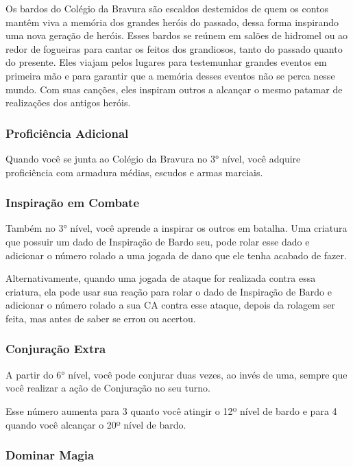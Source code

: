 \documentclass{RPG_Adventure}[2021/10/20]
\begin{document}
\begin{multicols}{2}
Os bardos do Colégio da Bravura são escaldos destemidos de quem os contos mantêm
viva a memória dos grandes heróis do passado, dessa forma inspirando uma nova
geração de heróis. Esses bardos se reúnem em salões de hidromel ou ao redor de
fogueiras para cantar os feitos dos grandiosos, tanto do passado quanto do
presente. Eles viajam pelos lugares para testemunhar grandes eventos em primeira
mão e para garantir que a memória desses eventos não se perca nesse mundo. Com
suas canções, eles inspiram outros a alcançar o mesmo patamar de realizações dos
antigos heróis.

\subsubsection{Proficiência Adicional}%

Quando você se junta ao Colégio da Bravura no 3° nível, você adquire
proficiência com armadura médias, escudos e armas marciais.

\subsubsection{Inspiração em Combate}%

Também no 3° nível, você aprende a inspirar os outros em batalha. Uma criatura
que possuir um dado de Inspiração de Bardo seu, pode rolar esse dado e adicionar
o número rolado a uma jogada de dano que ele tenha acabado de fazer.

Alternativamente, quando uma jogada de ataque for realizada contra essa
criatura, ela pode usar sua reação para rolar o dado de Inspiração de Bardo e
adicionar o número rolado a sua CA contra esse ataque, depois da rolagem ser
feita, mas antes de saber se errou ou acertou.

\subsubsection{Conjuração Extra}%

A partir do 6° nível, você pode conjurar duas vezes, ao invés de uma, sempre que
você realizar a ação de Conjuração no seu turno.

Esse número aumenta para 3 quanto você atingir o 12º nível de bardo e para 4
quando você alcançar o 20º nível de bardo.

\subsubsection{Dominar Magia}%


\end{multicols}
\end{document}
